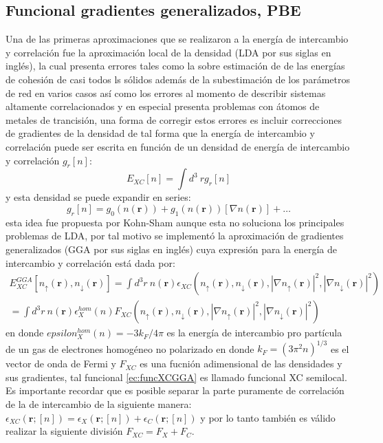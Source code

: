 \documentclass[12pt,a4paper, oneside]{book}
\begin{document}
   
   \subsection{Funcional gradientes generalizados, PBE} \label{susec:PBE}
   Una de las primeras aproximaciones que se realizaron a la energ\'ia de intercambio y correlaci\'on fue la aproximaci\'on local de la densidad (LDA por sus siglas en ingl\'es), la cual presenta errores tales como la sobre estimaci\'on de de las energ\'ias de cohesi\'on de casi todos ls s\'olidos adem\'as de la subestimaci\'on de los par\'ametros de red en varios casos as\'i como  los errores al momento de describir sistemas altamente correlacionados y en especial presenta problemas con \'atomos de metales de trancisi\'on, una forma de corregir estos errores es incluir correcciones de gradientes de la densidad de tal forma que la energ\'ia de intercambio y correlaci\'on puede ser escrita en funci\'on de un densidad de energ\'ia de intercambio y correlaci\'on $g_{r} [n]$:
   \begin{equation*}
   E_{XC} [n]= \int d^3~ r g_{r} [n]
   \end{equation*}
   y esta densidad se puede expandir en series:
   \begin{equation*}
   g_{r} [n] = g_0 (n(\pmb{r}))+ g_1 (n(\pmb{r})) [\nabla n(\pmb{r})]+ \ldots
   \end{equation*}
   esta idea fue propuesta por Kohn-Sham aunque esta no soluciona los principales problemas de LDA, por tal motivo se implement\'o la aproximaci\'on de gradientes generalizados (GGA por sus siglas en ingl\'es) cuya expresi\'on para la energ\'ia de intercambio y correlaci\'on est\'a dada por:
   \begin{multline}
      E_{XC}^{GGA} [n_{\uparrow} (\pmb{r}), n_{\downarrow}(\pmb{r})] = \int d^3 r ~ n(\pmb{r}) \epsilon_{XC} \left(n_{\uparrow} (\pmb{r}), n_{\downarrow}(\pmb{r}), \left|\nabla n_{\uparrow} (\pmb{r}) \right|^2, \left|\nabla n_{\downarrow} (\pmb{r}) \right|^2 \right)  \\
      = \int d^3 r ~ n(\pmb{r}) \epsilon_{X}^{hom} (n) F_{XC} \left(n_{\uparrow} (\pmb{r}), n_{\downarrow}(\pmb{r}), \left|\nabla n_{\uparrow} (\pmb{r}) \right|^2, \left|\nabla n_{\downarrow} (\pmb{r}) \right|^2 \right) \label{ec:funcXCGGA}
   \end{multline}
   en donde $ epsilon_{X}^{hom} (n) = -3k_F / 4\pi $ es la energ\'ia de intercambio pro part\'icula  de un gas de electrones homog\'eneo no polarizado en donde $k_F = (3 \pi^2 n)^{1/3}$ es el vector de onda de Fermi y $F_{XC}$ es una fucni\'on adimensional de las densidades y sus gradientes, tal funcional \ref{ec:funcXCGGA} es llamado funcional XC semilocal. Es importante recordar que es posible separar la parte puramente de correlaci\'on de la de intercambio de la siguiente manera: $ \epsilon_{XC} (\pmb{r}; [n] )= \epsilon_{X} (\pmb{r}; [n] )+ \epsilon_{C} (\pmb{r}; [n] ) $ y por lo tanto tambi\'en es v\'alido realizar la siguiente divisi\'on $ F_{XC} = F_{X}+ F_{C} $.
\end{document}
